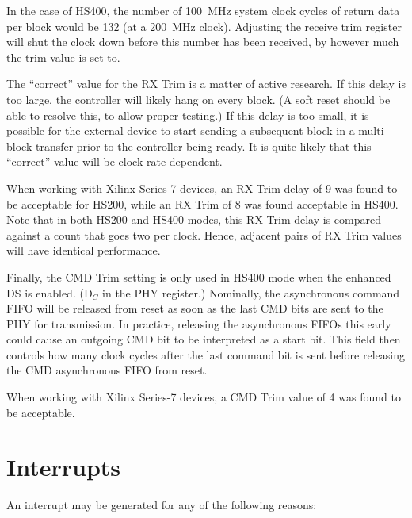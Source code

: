 \documentclass{gqtekspec}
\begin{document}
In the case of HS400, the number of 100~MHz system clock cycles of return
data per block would be 132 (at a 200~MHz clock).  Adjusting the receive trim
register will shut the clock down before this number has been received, by
however much the trim value is set to.

The ``correct'' value for the RX Trim is a matter of active research.  If this
delay is too large, the controller will likely hang on every block.  (A soft
reset should be able to resolve this, to allow proper testing.)  If this delay
is too small, it is possible for the external device to start sending a
subsequent block in a multi--block transfer prior to the controller being
ready.  It is quite likely that this ``correct'' value will be clock rate
dependent.

When working with Xilinx Series-7 devices, an RX Trim delay of 9 was found
to be acceptable for HS200, while an RX Trim of 8 was found acceptable in
HS400.  Note that in both HS200 and HS400 modes, this RX Trim delay is
compared against a count that goes two per clock.  Hence, adjacent pairs
of RX Trim values will have identical performance.

Finally, the CMD Trim setting is only used in HS400 mode when the enhanced
DS is enabled. (D$_C$ in the PHY register.)  Nominally, the asynchronous
command FIFO will be released from reset as soon as the last CMD bits are
sent to the PHY for transmission.  In practice, releasing the asynchronous
FIFOs this early could cause an outgoing CMD bit to be interpreted as a start
bit.  This field then controls how many clock cycles after the last command
bit is sent before releasing the CMD asynchronous FIFO from reset.

When working with Xilinx Series-7 devices, a CMD Trim value of 4 was found
to be acceptable.

\chapter{Interrupts}\label{ch:int}
An interrupt may be generated for any of the following reasons:
\end{document}
